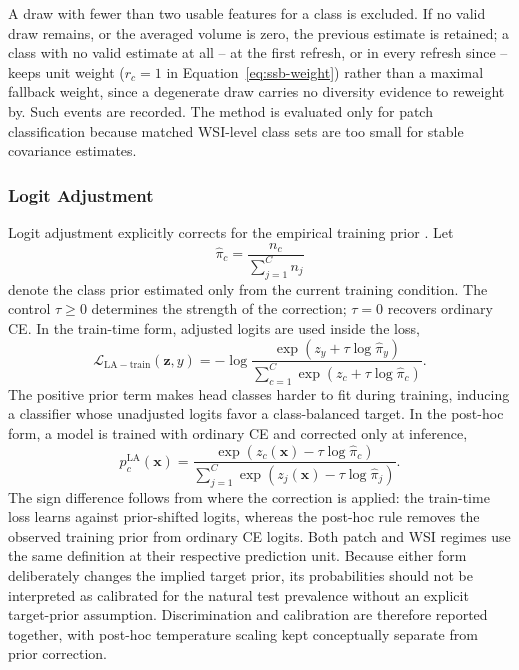 \documentclass[11pt]{article}
\begin{document}
A draw with fewer than two usable features for a class is excluded. If no valid draw remains, or the averaged volume is zero, the previous estimate is retained; a class with no valid estimate at all -- at the first refresh, or in every refresh since -- keeps unit weight ($r_c=1$ in Equation~\eqref{eq:ssb-weight}) rather than a maximal fallback weight, since a degenerate draw carries no diversity evidence to reweight by. Such events are recorded. The method is evaluated only for patch classification because matched WSI-level class sets are too small for stable covariance estimates.

\subsubsection{Logit Adjustment}
Logit adjustment explicitly corrects for the empirical training prior \citep{menon2021longTail}. Let
\begin{equation}
  \widehat{\pi}_c=\frac{n_c}{\sum_{j=1}^{C}n_j}
  \label{eq:empirical-prior}
\end{equation}
denote the class prior estimated only from the current training condition. The control $\tau\geq0$ determines the strength of the correction; $\tau=0$ recovers ordinary CE. In the train-time form, adjusted logits are used inside the loss,
\begin{equation}
  \mathcal{L}_{\mathrm{LA-train}}(\mathbf z,y)
  =-\log\frac{\exp(z_y+\tau\log\widehat{\pi}_y)}
  {\sum_{c=1}^{C}\exp(z_c+\tau\log\widehat{\pi}_c)}.
  \label{eq:logit-adjustment-train}
\end{equation}
The positive prior term makes head classes harder to fit during training, inducing a classifier whose unadjusted logits favor a class-balanced target. In the post-hoc form, a model is trained with ordinary CE and corrected only at inference,
\begin{equation}
  p_c^{\mathrm{LA}}(\mathbf x)=
  \frac{\exp(z_c(\mathbf x)-\tau\log\widehat{\pi}_c)}
  {\sum_{j=1}^{C}\exp(z_j(\mathbf x)-\tau\log\widehat{\pi}_j)}.
  \label{eq:logit-adjustment-posthoc}
\end{equation}
The sign difference follows from where the correction is applied: the train-time loss learns against prior-shifted logits, whereas the post-hoc rule removes the observed training prior from ordinary CE logits. Both patch and WSI regimes use the same definition at their respective prediction unit. Because either form deliberately changes the implied target prior, its probabilities should not be interpreted as calibrated for the natural test prevalence without an explicit target-prior assumption. Discrimination and calibration are therefore reported together, with post-hoc temperature scaling kept conceptually separate from prior correction.
\end{document}
